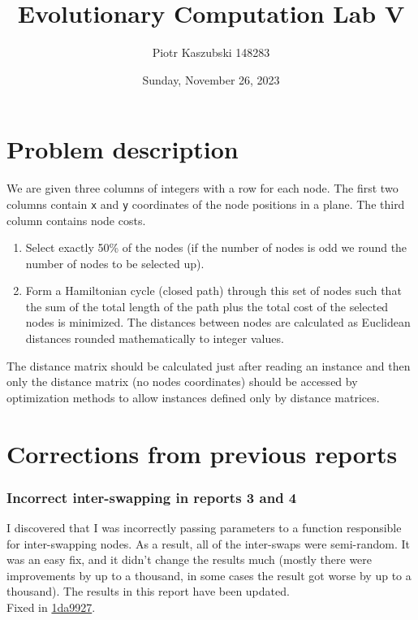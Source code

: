 \documentclass[14pt]{article}
\title{Evolutionary Computation Lab V}
\author{Piotr Kaszubski 148283}
\date{Sunday, November 26, 2023}
\begin{document}
\maketitle
\tableofcontents
\newpage

\section{Problem description}
We are given three columns of integers with a row for each node. The first two
columns contain \verb`x` and \verb`y` coordinates of the node positions in a
plane. The third column contains node costs.

\begin{enumerate}
	\item Select exactly 50\% of the nodes (if the number of nodes is odd we
		round the number of nodes to be selected up).
	\item Form a Hamiltonian cycle (closed path) through this set of nodes such
		that the sum of the total length of the path plus the total cost of the
		selected nodes is minimized. The distances between nodes are calculated
		as Euclidean distances rounded mathematically to integer values.
\end{enumerate}

The distance matrix should be calculated just after reading an instance and
then only the distance matrix (no nodes coordinates) should be accessed by
optimization methods to allow instances defined only by distance matrices.

\section{Corrections from previous reports}

\subsubsection*{Incorrect inter-swapping in reports 3 and 4}
I discovered that I was incorrectly passing parameters to a function
responsible for inter-swapping nodes. As a result, all of the inter-swaps were
semi-random. It was an easy fix, and it didn't change the results much (mostly
there were improvements by up to a thousand, in some cases the result got worse
by up to a thousand). The results in this report have been updated. \\
Fixed in \href{https://github.com/RoyalDonkey/put-ec-tasks/commit/1da9927b88eeb4440252d694a406773ccee52da2}{1da9927}.
\end{document}
